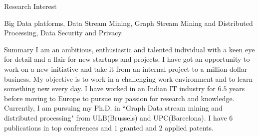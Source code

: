 \documentclass{resume} %
\begin{document}
\begin{rSection}{Research Interest}

Big Data platforms, Data Stream Mining, Graph Stream Mining and Distributed Processing, Data Security and Privacy.

\end{rSection}
\begin{rSection}{Summary}
I am an ambitious, enthusiastic and talented individual with a keen eye for detail and a flair for new startups and projects. I have got an opportunity to work on a new initiative and take it from an internal project to a million dollar business. My objective is to work in a challenging work environment and to learn something new every day. I have worked in an Indian IT industry for $6.5$ years before moving to Europe to pursue my passion for research and knowledge. Currently, I am pursuing my Ph.D. in ``Graph Data stream mining and distributed processing" from ULB(Brussels) and UPC(Barcelona). I have $6$ publications in top conferences and $1$ granted and $2$ applied patents.
\end{rSection}




\end{document}
